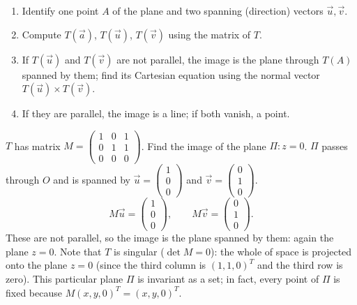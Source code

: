 \documentclass[11pt]{article}
\begin{document}
\begin{methode}
\begin{enumerate}
\item Identify one point $A$ of the plane and two spanning (direction) vectors $\vec{u}, \vec{v}$.
\item Compute $T(\vec{a})$, $T(\vec{u})$, $T(\vec{v})$ using the matrix of $T$.
\item If $T(\vec{u})$ and $T(\vec{v})$ are not parallel, the image is the plane through $T(A)$ spanned by them; find its Cartesian equation using the normal vector $T(\vec{u}) \times T(\vec{v})$.
\item If they are parallel, the image is a line; if both vanish, a point.
\end{enumerate}
\end{methode}

\begin{exoresolu}
$T$ has matrix $M = \begin{pmatrix} 1 & 0 & 1 \\ 0 & 1 & 1 \\ 0 & 0 & 0 \end{pmatrix}$. Find the image of the plane $\Pi: z = 0$.
\tcblower
$\Pi$ passes through $O$ and is spanned by $\vec{u} = \begin{pmatrix} 1 \\ 0 \\ 0 \end{pmatrix}$ and $\vec{v} = \begin{pmatrix} 0 \\ 1 \\ 0 \end{pmatrix}$.
\[
M\vec{u} = \begin{pmatrix} 1 \\ 0 \\ 0 \end{pmatrix}, \qquad M\vec{v} = \begin{pmatrix} 0 \\ 1 \\ 0 \end{pmatrix}.
\]
These are not parallel, so the image is the plane spanned by them: again the plane $z = 0$. Note that $T$ is singular ($\det M = 0$): the whole of space is projected onto the plane $z = 0$ (since the third column is $(1,1,0)^T$ and the third row is zero). This particular plane $\Pi$ is invariant as a set; in fact, every point of $\Pi$ is fixed because $M(x,y,0)^T = (x,y,0)^T$.
\end{exoresolu}
\end{document}
